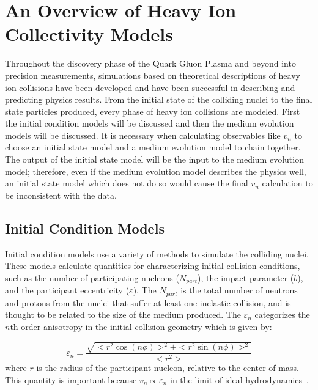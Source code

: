 \section{An Overview of Heavy Ion Collectivity Models}
Throughout the discovery phase of the Quark Gluon Plasma and beyond into precision measurements, simulations based on theoretical descriptions of heavy ion collisions have been developed and have been successful in describing and predicting physics results. From the initial state of the colliding nuclei to the final state particles produced, every phase of heavy ion collisions are modeled. First the initial condition models will be discussed and then the medium evolution models will be discussed. It is necessary when calculating observables like $v_n$ to choose an initial state model and a medium evolution model to chain together. The output of the initial state model will be the input to the medium evolution model; therefore, even if the medium evolution model describes the physics well, an initial state model which does not do so would cause the final $v_n$ calculation to be inconsistent with the data. 


\subsection{Initial Condition Models}
Initial condition models use a variety of methods to simulate the colliding nuclei. These models calculate quantities for characterizing initial collision conditions, such as the number of participating nucleons ($N_{part}$), the impact parameter ($b$), and the participant eccentricity ($\varepsilon$). The $N_{part}$ is the total number of neutrons and protons from the nuclei that suffer at least one inelastic collision, and is thought to be related to the size of the medium produced. The $\varepsilon_n$ categorizes the $n$th order anisotropy in the initial collision geometry which is given by:

\begin{equation}
\label{eqn:eccentricity_equation_ch2}
\varepsilon_n = \frac{\sqrt{<r^2 \cos(n\phi)>^2+<r^2 \sin(n\phi)>^2}}{<r^2>}
\end{equation}
where $r$ is the radius of the participant nucleon, relative to the center of mass. This quantity is important because $v_n \propto \varepsilon_n$ in the limit of ideal hydrodynamics~\cite{PhysRevC.81.054905}.

